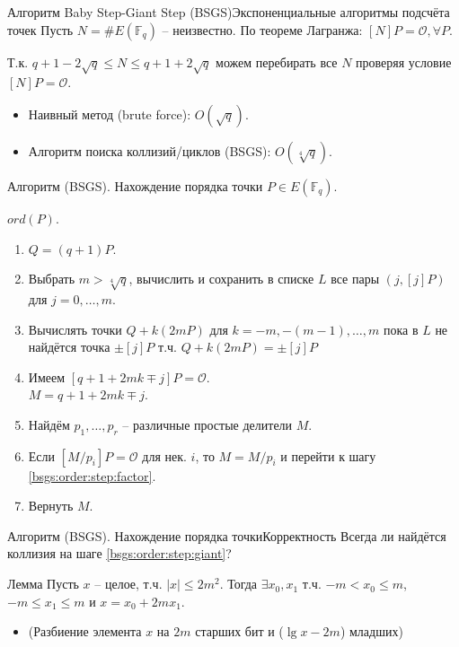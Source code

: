 \documentclass{beamer}
\begin{document}
\begin{frame}{Алгоритм Baby Step-Giant Step (BSGS)}{Экспоненциальные алгоритмы подсчёта точек}
 Пусть $N = \#E(\mathbb{F}_q)$ -- неизвестно. По теореме Лагранжа: $[N] P = \mathcal{O}, \forall P$.

Т.к. $q + 1 - 2 \sqrt{q} \leq N \leq q + 1 + 2 \sqrt{q}$ \structure{$\implies$} можем перебирать все $N$ проверяя условие $[N] P = \mathcal{O}$.

\begin{itemize}
    \item Наивный метод (brute force): $O(\sqrt{q})$.
    \item Алгоритм поиска коллизий/циклов (BSGS): $O(\sqrt[4]{q})$.
\end{itemize}
\end{frame}


\begin{frame}{Алгоритм (BSGS). Нахождение порядка точки}
 $P \in E(\mathbb{F}_q)$.

 $ord(P)$.
\begin{enumerate}
    \item $Q = (q+1) P$.
    \item Выбрать $m > \sqrt[4]{q}$, вычислить и сохранить в списке $L$ все пары $(j, [j] P)$ для $j = 0, \ldots, m$. \hfill{}
    \item \label{bsgs:order:step:giant}
    Вычислять точки $Q + k (2m P)$ для $k = -m, -(m-1), \ldots, m$ пока в $L$ не найдётся точка $\pm [j] P$ т.ч. $Q + k(2m P) = \pm [j] P$ \hfill{}
    \item Имеем $[q + 1 + 2 m k \mp j] P = \mathcal{O}$.\\$M = q + 1 + 2 m k \mp j$.
    \item \label{bsgs:order:step:factor} Найдём $p_1, \ldots, p_r$ -- различные простые делители $M$.
    \item Если $[M/p_i] P = \mathcal{O}$ для нек. $i$, то $M = M/p_i$ и перейти к шагу \ref{bsgs:order:step:factor}.
    \item Вернуть $M$.
\end{enumerate}
\end{frame}

\begin{frame}{Алгоритм (BSGS). Нахождение порядка точки}{Корректность}
Всегда ли найдётся коллизия на шаге \ref{bsgs:order:step:giant}?
\begin{block}{Лемма}
Пусть $x$ -- целое, т.ч. $|x| \leq 2 m^2$. Тогда $\exists x_0,x_1$ т.ч. $-m < x_0 \leq m$, $-m \leq x_1 \leq m$ и $x = x_0 + 2 m x_1$.
\end{block}
\begin{itemize}
    \item (Разбиение элемента $x$ на $2m$ старших бит и ($\lg{x} - 2m$) младших)
\end{itemize}
\end{frame}
\end{document}
